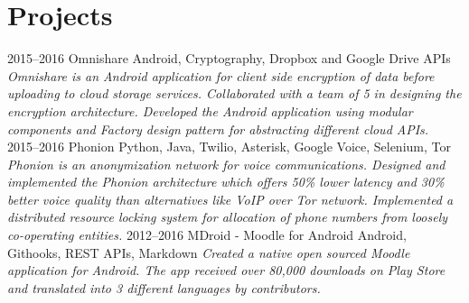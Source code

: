 \documentclass[]{friggeri-cv}
\begin{document}
\section{Projects}
\begin{entrylist}
  \entry
    {2015–2016}
    {Omnishare}
    {Android, Cryptography, Dropbox and Google Drive APIs}
    {\emph{Omnishare is an Android application for client side encryption of data before uploading to cloud storage services. Collaborated with a team of 5 in designing the encryption architecture. Developed the Android application using modular components and Factory design pattern for abstracting different cloud APIs.}}
  \entry
    {2015–2016}
    {Phonion}
    {Python, Java, Twilio, Asterisk, Google Voice, Selenium, Tor}
    {\emph{Phonion is an anonymization network for voice communications. Designed and implemented the Phonion architecture which offers 50\% lower latency and 30\% better voice quality than alternatives like VoIP over Tor network. Implemented a distributed resource locking system for allocation of phone numbers from loosely co-operating entities.}}
  \entry
    {2012–2016}
    {MDroid - Moodle for Android}
    {Android, Githooks, REST APIs, Markdown}
    {\emph{Created a native open sourced Moodle application for Android. The app received over 80,000 downloads on Play Store and translated into 3 different languages by contributors.}}
\end{entrylist}
\end{document}
